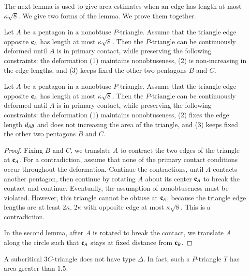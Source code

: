 The next lemma is used to give area estimates when an edge has length
at most $\kappa\sqrt{8}$.  We give two forms of the lemma.  We prove
them together.

\begin{lemma} 
  Let $A$ be a pentagon in a nonobtuse $P$-triangle.  Assume that the
  triangle edge opposite ${\mathbf c}_A$ has length at most $\kappa\sqrt{8}$.
  Then the $P$-triangle can be continuously deformed until $A$ is in
  primary contact, while preserving the following constraints: the
  deformation (1) maintains nonobtuseness, (2) is non-increasing in
  the edge lengths, and (3) keeps fixed the other two pentagons $B$
  and $C$.
\end{lemma}

\begin{lemma} 
  Let $A$ be a pentagon in a nonobtuse $P$-triangle.  Assume that the
  triangle edge opposite ${\mathbf c}_A$ has length at most $\kappa\sqrt{8}$.
  Then the $P$-triangle can be continuously deformed until $A$ is in
  primary contact, while preserving the following constraints: the
  deformation (1) maintains nonobtuseness, (2) fixes the
edge length $d_{AB}$ and does not increasing  the area of the triangle, 
and (3) keeps fixed the other two pentagons $B$
  and $C$.
\end{lemma}

\begin{proof} Fixing $B$ and $C$, we translate $A$ to contract the two
  edges of the triangle at ${\mathbf c}_A$.  For a contradiction, assume that
  none of the primary contact conditions occur throughout the
  deformation.  Continue the contractions, until $A$ contacts another
  pentagon, then continue by rotating $A$ about its center ${\mathbf c}_A$ to
  break the contact and continue.  Eventually, the assumption of
  nonobtuseness must be violated.  However, this triangle cannot be
  obtuse at ${\mathbf c}_A$, because the triangle edge lengths are at least $2
  \kappa$, $2 \kappa$ with opposite edge at most
  $\kappa\sqrt{8}$. This is a contradiction.

  In the second lemma, after $A$ is rotated to break the contact, we
  translate $A$ along the circle such that ${\mathbf c}_A$ stays at fixed
  distance from ${\mathbf c}_B$.
\end{proof}

\begin{lemma} 
  A subcritical $3C$-triangle does not have type $\Delta$.  In fact,
  such a $P$-triangle $T$ has area greater than $1.5$.
\end{lemma}


